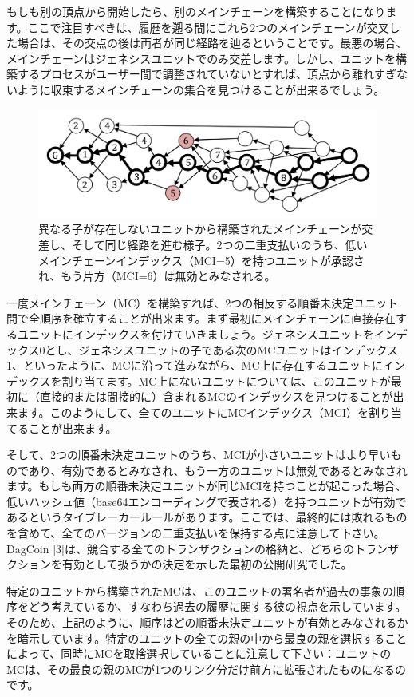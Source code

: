 \documentclass[a4paper, dvipdfmx]{jsarticle}
\begin{document}
もしも別の頂点から開始したら、別のメインチェーンを構築することになります。ここで注目すべきは、履歴を遡る間にこれら2つのメインチェーンが交叉した場合は、その交点の後は両者が同じ経路を辿るということです。最悪の場合、メインチェーンはジェネシスユニットでのみ交差します。しかし、ユニットを構築するプロセスがユーザー間で調整されていないとすれば、頂点から離れすぎないように収束するメインチェーンの集合を見つけることが出来るでしょう。

\begin{figure}[htbp]
  \includegraphics[width=\linewidth]{fig3.png}
  \caption{異なる子が存在しないユニットから構築されたメインチェーンが交差し、そして同じ経路を進む様子。2つの二重支払いのうち、低いメインチェーンインデックス（MCI=5）を持つユニットが承認され、もう片方（MCI=6）は無効とみなされる。}
\end{figure}

一度メインチェーン（MC）を構築すれば、2つの相反する順番未決定ユニット間で全順序を確立することが出来ます。まず最初にメインチェーンに直接存在するユニットにインデックスを付けていきましょう。ジェネシスユニットをインデックス0とし、ジェネシスユニットの子である次のMCユニットはインデックス1、といったように、MCに沿って進みながら、MC上に存在するユニットにインデックスを割り当てます。MC上にないユニットについては、このユニットが最初に（直接的または間接的に）含まれるMCのインデックスを見つけることが出来ます。このようにして、全てのユニットにMCインデックス（MCI）を割り当てることが出来ます。

そして、2つの順番未決定ユニットのうち、MCIが小さいユニットはより早いものであり、有効であるとみなされ、もう一方のユニットは無効であるとみなされます。もしも両方の順番未決定ユニットが同じMCIを持つことが起こった場合、低いハッシュ値（base64エンコーディングで表される）を持つユニットが有効であるというタイブレーカールールがあります。ここでは、最終的には敗れるものを含めて、全てのバージョンの二重支払いを保持する点に注意して下さい。DagCoin [3]は、競合する全てのトランザクションの格納と、どちらのトランザクションを有効として扱うかの決定を示した最初の公開研究でした。

特定のユニットから構築されたMCは、このユニットの署名者が過去の事象の順序をどう考えているか、すなわち過去の履歴に関する彼の視点を示しています。そのため、上記のように、順序はどの順番未決定ユニットが有効とみなされるかを暗示しています。特定のユニットの全ての親の中から最良の親を選択することによって、同時にMCを取捨選択していることに注意して下さい：ユニットのMCは、その最良の親のMCが1つのリンク分だけ前方に拡張されたものになるのです。
\end{document}
